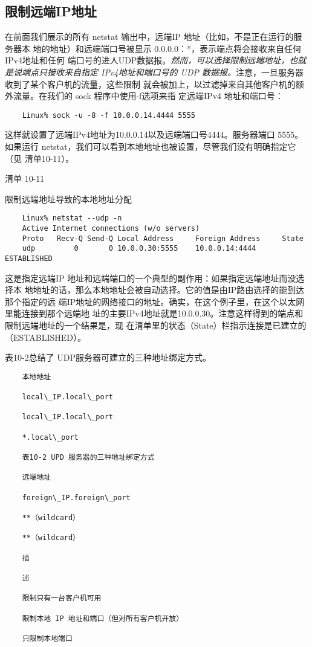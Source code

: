 \subsection{限制远端IP地址}
在前面我们展示的所有 netstat 输出中，远端IP 地址（比如，不是正在运行的服务器本
地的地址）和远端端口号被显示 0.0.0.0：*，表示端点将会接收来自任何IPv4地址和任何
端口号的进人UDP数据报。\emph{然而，可以选择限制远端地址，也就是说端点只接收来自指定
IPv4地址和端口号的 UDP 数据报。}注意，一旦服务器收到了某个客户机的流量，这些限制
就会被加上，以过滤掉来自其他客户机的额外流量。在我们的 sock 程序中使用-f选项来指
定远端IPv4 地址和端口号：

\begin{verbatim}
    Linux% sock -u -8 -f 10.0.0.14.4444 5555
\end{verbatim}

这样就设置了远端IPv4地址为10.0.0.14以及远端端口号4444。服务器端口
5555。如果运行 netstat，我们可以看到本地地址也被设置，尽管我们没有明确指定它（见
清单10-11）。

清单 10-11

限制远端地址导致的本地地址分配

\begin{verbatim}
    Linux% netstat --udp -n
    Active Internet connections (w/o servers)
    Proto   Recv-Q Send-Q Local Address     Foreign Address     State
    udp         0       0 10.0.0.30:5555    10.0.0.14:4444      ESTABLISHED
\end{verbatim}

这是指定远端IP 地址和远端端口的一个典型的副作用：如果指定远端地址而没选择本
地地址的话，那么本地地址会被自动选择。它的值是由IP路由选择的能到达那个指定的远
端IP地址的网络接口的地址。确实，在这个例子里，在这个以太网里能连接到那个远端地
址的主要IPv4地址就是10.0.0.30。注意这样得到的端点和限制远端地址的一个结果是，现
在清单里的状态（State）栏指示连接是已建立的（ESTABLISHED）。

表10-2总结了 UDP服务器可建立的三种地址绑定方式。

\begin{verbatim}
    本地地址
    
    local\_IP.local\_port
    
    local\_IP.local\_port
    
    *.local\_port
    
    表10-2 UPD 服务器的三种地址绑定方式
    
    远端地址
    
    foreign\_IP.foreign\_port
    
    **（wildcard）
    
    **（wildcard）
    
    描
    
    述
    
    限制只有一台客户机可用
    
    限制本地 IP 地址和端口（但对所有客户机开放）
    
    只限制本地端口
\end{verbatim}

